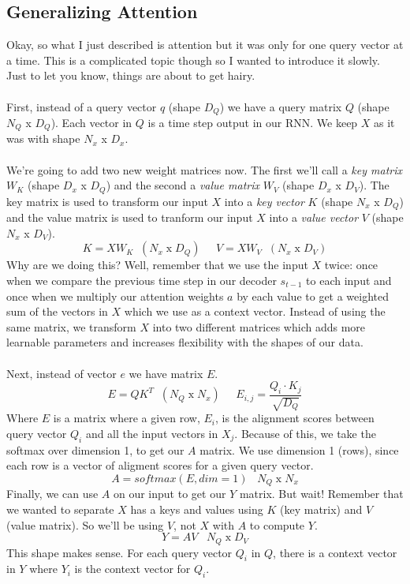 \documentclass[12pt]{article}
\begin{document}
\subsection{Generalizing Attention}
Okay, so what I just described is attention but it was only for one query vector 
at a time. This is a complicated topic though so I wanted to introduce it slowly. 
Just to let you know, things are about to get hairy. 
~\\
~\\
First, instead of a query vector $q$ (shape $D_Q$) we have a query matrix $Q$
(shape $N_Q$ x $D_Q$). Each vector in $Q$ is a time step output in our RNN. 
We keep $X$ as it was with shape $N_x$ x $D_x$. 
~\\
~\\
We're going to add two new weight matrices now. The first we'll call a 
\emph{key matrix} $W_K$ (shape $D_x$ x $D_Q$) and the second a \emph{value matrix} 
$W_V$ (shape $D_x$ x $D_V$). The key matrix is used to transform our input 
$X$ into a \emph{key vector} $K$ (shape $N_x$ x $D_Q$) and the value matrix is 
used to tranform our input $X$ into a \emph{value vector} $V$ (shape $N_x$ x $D_V$). 
\begin{equation*}
    K = XW_K \; \; (N_x \; \text{x} \; D_Q) \; \; \; \; \; 
    V= XW_V \; \; (N_x \; \text{x} \; D_V) 
\end{equation*}
Why are we doing this? Well, remember that we use the input $X$ twice: once when we 
compare the previous time step in our decoder $s_{t-1}$ to each input and once when 
we multiply our attention weights $a$ by each value to get a weighted sum of the 
vectors in $X$ which we use as a context vector. Instead of using the same matrix, 
we transform $X$ into two different matrices which adds more learnable parameters 
and increases flexibility with the shapes of our data. 
~\\
~\\
Next, instead of vector $e$ we have matrix $E$. 
\begin{equation*}
    E = QK^T \; \; (N_Q \; \text{x} \; N_x)\; \; \; \; \; E_{i, j} = \frac{Q_i \cdot K_j}{\sqrt{D_Q}}
\end{equation*}
Where $E$ is a matrix where a given row, $E_i$, is the alignment scores between query vector 
$Q_i$ and all the input vectors in $X_j$. Because of this, we take the softmax over 
dimension 1, to get our $A$ matrix. We use dimension 1 (rows), since each row is a vector 
of aligment scores for a given query vector. 
\begin{equation*}
    A = softmax(E, dim=1) \; \; \; N_Q \; \text{x} \; N_x
\end{equation*}
Finally, we can use $A$ on our input to get our $Y$ matrix. But wait! Remember that 
we wanted to separate $X$ has a keys and values using $K$ (key matrix) and 
$V$ (value matrix). So we'll be using $V$, not $X$ with $A$ to compute $Y$. 
\begin{equation*}
    Y = AV \; \; \; N_Q \; \text{x} \; D_V
\end{equation*}
This shape makes sense. For each query vector $Q_i$ in $Q$, there is a context 
vector in $Y$ where $Y_i$ is the context vector for $Q_i$. 
\end{document}
